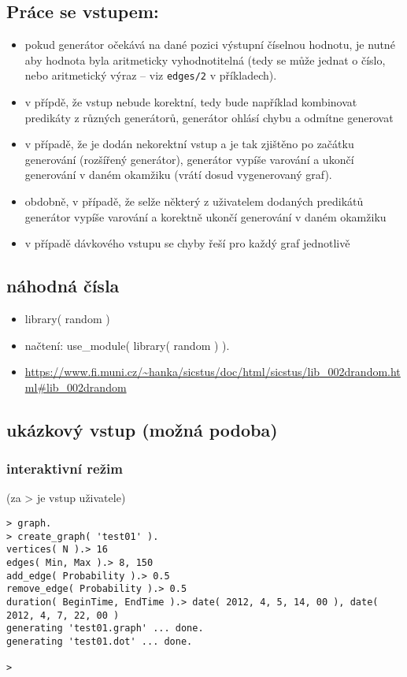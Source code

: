 \documentclass[11pt, a4paper]{article}
\newcommand{\pl}[1]{\texttt{#1}} %
\theoremstyle{plain}
\theoremstyle{definition}
\theoremstyle{remark}
\begin{document}
\subsection{Práce se vstupem:}
\begin{itemize}
    \item pokud generátor očekává na dané pozici výstupní číselnou hodnotu, je nutné
    aby hodnota byla aritmeticky vyhodnotitelná (tedy se může jednat o číslo,
    nebo aritmetický výraz -- viz \pl{edges/2} v příkladech).
    \item v přípdě, že vstup nebude korektní, tedy bude například kombinovat predikáty
    z různých generátorů, generátor ohlásí chybu a odmítne generovat
    \item v případě, že je dodán nekorektní vstup a je tak zjištěno po začátku generování
    (rozšířený generátor), generátor vypíše varování a ukončí generování v daném
    okamžiku (vrátí dosud vygenerovaný graf).
    \item obdobně, v případě, že selže některý z uživatelem dodaných predikátů generátor
    vypíše varování a korektně ukončí generování v daném okamžiku
    \item v případě dávkového vstupu se chyby řeší pro každý graf jednotlivě
\end{itemize}

\subsection{náhodná čísla}
\begin{itemize}
    \item library( random )
    \item načtení: use\_module( library( random ) ).
    \item \url{https://www.fi.muni.cz/~hanka/sicstus/doc/html/sicstus/lib_002drandom.html#lib_002drandom}
\end{itemize}

\subsection{ukázkový vstup (možná podoba)}

\subsubsection{interaktivní režim}
(za > je vstup uživatele)
\begin{verbatim}
> graph.
> create_graph( 'test01' ).
vertices( N ).> 16
edges( Min, Max ).> 8, 150
add_edge( Probability ).> 0.5
remove_edge( Probability ).> 0.5
duration( BeginTime, EndTime ).> date( 2012, 4, 5, 14, 00 ), date( 2012, 4, 7, 22, 00 )
generating 'test01.graph' ... done.
generating 'test01.dot' ... done.

>
\end{verbatim}
\end{document}
